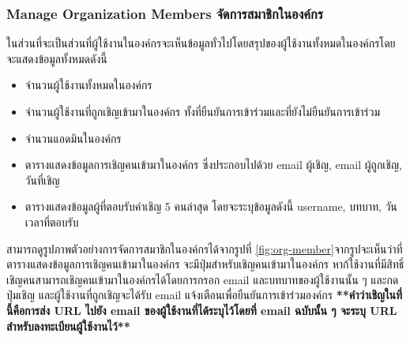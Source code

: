 \subsubsection{\ifenglish Manage Organization Members \else จัดการสมาชิกในองค์กร \fi}
\ifenglish \else 
ในส่วนที่จะเป็นส่วนที่ผู้ใช้งานในองค์กรจะเห็นข้อมูลทั่วไปโดยสรุปของผู้ใช้งานทั้งหมดในองค์กรโดยจะแสดงข้อมูลทั้งหมดดังนี้
\begin{itemize}
    \item จำนวนผู้ใช้งานทั้งหมดในองค์กร
    \item จำนวนผู้ใช้งานที่ถูกเชิญเข้ามาในองค์กร ทั้งที่ยืนยันการเข้าร่วมและที่ยังไม่ยืนยันการเข้าร่วม
    \item จำนวนแอดมินในองค์กร
    \item ตารางแสดงข้อมูลการเชิญคนเข้ามาในองค์กร ซึ่งประกอบไปด้วย email ผู้เชิญ, email ผู้ถูกเชิญ, วันที่เชิญ
    \item ตารางแสดงข้อมูลผู้ที่ตอบรับคำเชิญ 5 คนล่าสุด โดยจะระบุข้อมูลดังนี้ username, บทบาท, วันเวลาที่ตอบรับ
\end{itemize}
สามารถดูรูปภาพตัวอย่างการจัดการสมาชิกในองค์กรได้จากรูปที่ \ref{fig:org-member}จากรูปจะเห็นว่าที่ตารางแสดงข้อมูลการเชิญคนเข้ามาในองค์กร จะมีปุ่มสำหรับเชิญคนเข้ามาในองค์กร หาก้ใช้งานที่มีสิทธิ์เชิญคนสามารถเชิญคนเข้ามาในองค์กรได้โดยการกรอก email และบทบาทของผู้ใช้งานนั้น ๆ และกดปุ่มเชิญ และผู้ใช้งานที่ถูกเชิญจะได้รับ email แจ้งเตือนเพื่อยืนยันการเข้าร่วมองค์กร \textbf{**คำว่าเชิญในที่นี้คือการส่ง URL ไปยัง email ของผู้ใช้งานที่ได้ระบุไว้โดยที่ email ฉบับนั้น ๆ จะระบุ URL สำหรับลงทะเบียนผู้ใช้งานไว้**}
\fi



